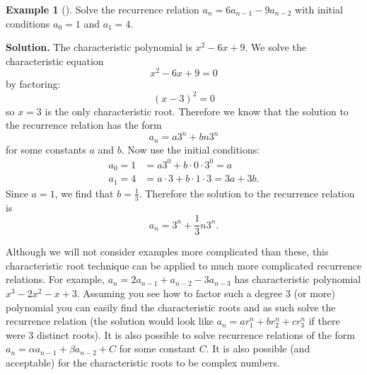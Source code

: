 \documentclass[12pt,]{book}
\theoremstyle{plain}
\theoremstyle{definition}
\theoremstyle{definition}
\newtheorem{example}[theorem]{Example}
\theoremstyle{definition}
\numberwithin{equation}{chapter}
\newcommand{\amp}{&}
\begin{document}
\begin{example}[]\label{example-24}
\hypertarget{p-335}{}%
Solve the recurrence relation \(a_n = 6a_{n-1} - 9a_{n-2}\) with initial conditions \(a_0 = 1\) and \(a_1 = 4\).%
\par\smallskip%
\noindent\textbf{Solution.}\hypertarget{solution-38}{}\quad%
\hypertarget{p-336}{}%
The characteristic polynomial is \(x^2 - 6x + 9\). We solve the characteristic equation%
\begin{equation*}
x^2 - 6x + 9 = 0
\end{equation*}
by factoring:%
\begin{equation*}
(x - 3)^2 = 0
\end{equation*}
so \(x =3\) is the only characteristic root. Therefore we know that the solution to the recurrence relation has the form%
\begin{equation*}
a_n = a 3^n + bn3^n
\end{equation*}
for some constants \(a\) and \(b\). Now use the initial conditions:%
\begin{align*}
a_0 = 1 \amp = a 3^0 + b\cdot 0 \cdot 3^0 = a\\
a_1 = 4 \amp = a\cdot 3 + b\cdot 1 \cdot3 = 3a + 3b.
\end{align*}
Since \(a = 1\), we find that \(b = \frac{1}{3}\). Therefore the solution to the recurrence relation is%
\begin{equation*}
a_n = 3^n + \frac{1}{3}n3^n.
\end{equation*}
%
\end{example}
\hypertarget{p-337}{}%
Although we will not consider examples more complicated than these, this characteristic root technique can be applied to much more complicated recurrence relations. For example, \(a_n = 2a_{n-1} + a_{n-2} - 3a_{n-3}\) has characteristic polynomial \(x^3 - 2 x^2 - x + 3\). Assuming you see how to factor such a degree 3 (or more) polynomial you can easily find the characteristic roots and as such solve the recurrence relation (the solution would look like \(a_n = ar_1^n + br_2^n + cr_3^n\) if there were 3 distinct roots). It is also possible to solve recurrence relations of the form \(a_n = \alpha a_{n-1} + \beta a_{n-2} + C\) for some constant \(C\). It is also possible (and acceptable) for the characteristic roots to be complex numbers.%
\typeout{************************************************}
\typeout{************************************************}
\end{document}
